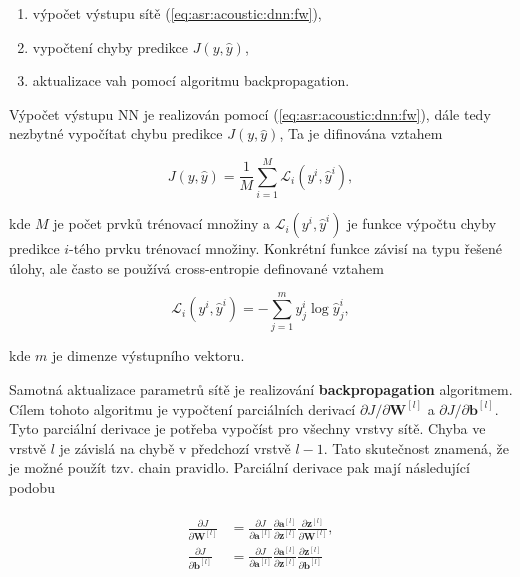 \begin{enumerate}
  \item výpočet výstupu sítě (\ref{eq:asr:acoustic:dnn:fw}),
  \item vypočtení chyby predikce $J\left(y, \hat{y}\right)$,
  \item aktualizace vah pomocí algoritmu backpropagation.
\end{enumerate}

\noindent Výpočet výstupu NN je realizován pomocí (\ref{eq:asr:acoustic:dnn:fw}), dále tedy nezbytné vypočítat chybu predikce $J\left(y, \hat{y}\right)$, Ta je difinována vztahem

\begin{equation}
  J\left(y, \hat{y}\right) = \frac{1}{M} \sum_{i=1}^{M}\mathcal{L}_{i}\left(y^{i}, \hat{y}^{i}\right),
  \label{eq:asr:acoustic:dnn:cost}
\end{equation}

\noindent kde $M$ je počet prvků trénovací množiny a $\mathcal{L}_{i}\left(y^{i}, \hat{y}^{i}\right)$ je funkce výpočtu chyby predikce $i$-tého prvku trénovací množiny. Konkrétní funkce závisí na typu řešené úlohy, ale často se používá cross-entropie definované vztahem

\begin{equation}
  \mathcal{L}_{i}\left(y^{i}, \hat{y}^{i}\right) = - \sum_{j=1}^{m} y^{i}_{j} \log \hat{y}^{i}_{j},
  \label{eq:asr:acoustic:dnn:cost}
\end{equation}

\noindent kde $m$ je dimenze výstupního vektoru.

Samotná aktualizace parametrů sítě je realizování \textbf{backpropagation} algoritmem. Cílem tohoto algoritmu je vypočtení parciálních derivací $\partial J / \partial \mathbf{W}^{[l]}$ a $\partial J/\partial \mathbf{b}^{[l]}$. Tyto parciální derivace je potřeba vypočíst pro všechny vrstvy sítě. Chyba ve vrstvě $l$ je závislá na chybě v předchozí vrstvě $l-1$. Tato skutečnost znamená, že je možné použít tzv. chain pravidlo. Parciální derivace pak mají následující podobu

\begin{align}
  \begin{split}
    \frac{\partial J}{\partial \mathbf{W}^{[l]}} & = \frac{\partial J}{\partial \mathbf{a}^{[l]}} \frac{\partial \mathbf{a}^{[l]}}{\partial \mathbf{z}^{[l]}} \frac{\partial \mathbf{z}^{[l]}}{\partial \mathbf{W}^{[l]}}, \\
    \frac{\partial J}{\partial \mathbf{b}^{[l]}} & = \frac{\partial J}{\partial \mathbf{a}^{[l]}} \frac{\partial \mathbf{a}^{[l]}}{\partial \mathbf{z}^{[l]}} \frac{\partial \mathbf{z}^{[l]}}{\partial \mathbf{b}^{[l]}}
  \end{split}
  \label{eq:asr:acoustic:dnn:partial}
\end{align}

